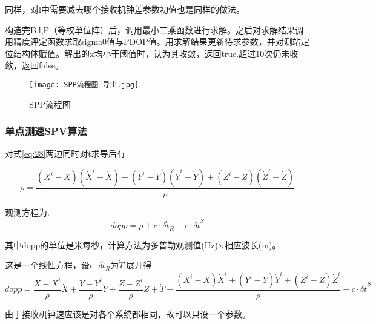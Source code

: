 \documentclass{ctexart}
\begin{document}
同样，对l中需要减去哪个接收机钟差参数初值也是同样的做法。

构造完B,l,P（等权单位阵）后，调用最小二乘函数进行求解。之后对求解结果调用精度评定函数求取sigma0值与PDOP值。用求解结果更新待求参数，并对测站定位结构体赋值。解出的x均小于阈值时，认为其收敛，返回true.超过10次仍未收敛，返回false。
\begin{figure}[H]
\texttt{[image: SPP流程图-导出.jpg]}
\caption{SPP流程图}
\end{figure}
\subsubsection{单点测速SPV算法}
\label{2.7.3}
对式\eqref{eq:28}两边同时对t求导后有

\begin{equation}
\dot{\rho}=\dfrac{(X^i-X)(\dot{X}^i-\dot{X})+(Y^i-Y)(\dot{Y}^i-\dot{Y})+(Z^i-Z)(\dot{Z}^i-\dot{Z})}{\rho}
\end{equation}

观测方程为.
\begin{equation}
dopp=\dot{\rho}+c\cdot\delta\dot{t}_R-c\cdot\delta\dot{t}^S
\end{equation}

其中dopp的单位是米每秒，计算方法为多普勒观测值(Hz)$\times$相应波长(m)。

这是一个线性方程，设$c\cdot\delta\dot{t}_R$为$\dot{T}$,展开得
\begin{equation}
dopp=\dfrac{X-X^i}{\rho}\dot{X}+\dfrac{Y-Y^i}{\rho}\dot{Y}+\dfrac{Z-Z^i}{\rho}\dot{Z}+\dot{T}+\dfrac{(X^i-X)\dot{X}^i+(Y^i-Y)\dot{Y}^i+(Z^i-Z)\dot{Z}^i}{\rho}-c\cdot\delta\dot{t}^S
\end{equation}

由于接收机钟速应该是对各个系统都相同，故可以只设一个参数。
\end{document}
